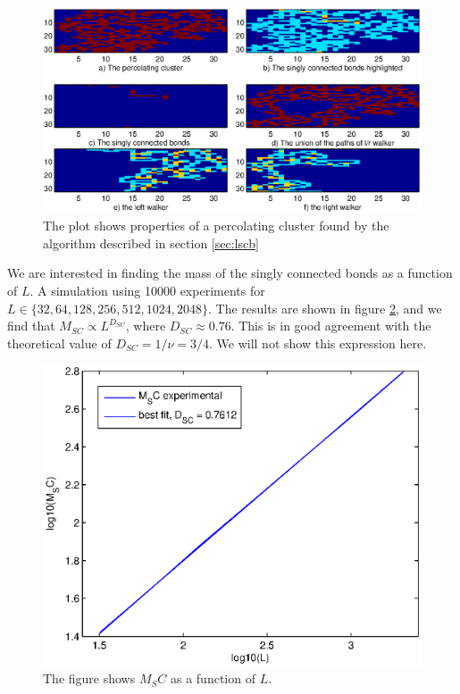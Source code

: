 \documentclass[12pt]{article}
\begin{document}
\begin{figure}[ht]
\centering

	\includegraphics[width=13cm]{singlyconnected.eps}


\caption[Optional caption for list of figures]{The plot shows properties of a percolating cluster found by the algorithm  described in section \ref{sec:lscb}}
\label{fig:10}
\end{figure}

We are interested in finding the mass of the singly connected bonds as a function of $L$. A simulation using 10000 experiments for $L\in\{ 32,64,128,256,512,1024, 2048 \}$. The results are shown in figure \ref{fig:11}, and we find that $M_{SC} \propto L^{D_{SC}}$, where $D_{SC} \approx 0.76$. This is in good agreement with the theoretical value of $D_{SC} = 1/\nu = 3/4$. We will not show this expression here. 

\begin{figure}[ht]
\centering

	\includegraphics[width=13cm]{dsc.eps}


\caption[Optional caption for list of figures]{The figure shows $M_SC$ as a function of $L$.}
\label{fig:11}
\end{figure}
\end{document}
